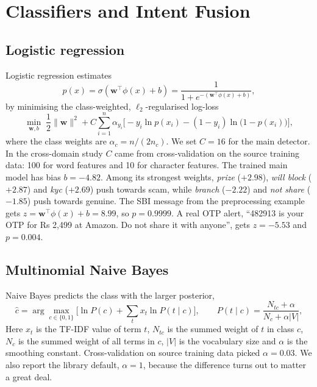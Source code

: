 \section{Classifiers and Intent Fusion}\label{sec:fusion}
\subsection{Logistic regression}
Logistic regression estimates
\begin{equation}
p(x)=\sigma\!\left(\mathbf{w}^{\top}\phi(x)+b\right)=\frac{1}{1+e^{-(\mathbf{w}^{\top}\phi(x)+b)}},
\end{equation}
by minimising the class-weighted, $\ell_2$-regularised log-loss
\begin{equation}
\min_{\mathbf{w},b}\;\frac{1}{2}\|\mathbf{w}\|^2 + C\sum_{i=1}^{n}\alpha_{y_i}\Big[-y_i\ln p(x_i)-(1-y_i)\ln\big(1-p(x_i)\big)\Big],
\end{equation}
where the class weights are $\alpha_c=n/(2n_c)$. We set $C=16$ for the main detector. In the cross-domain study $C$ came from cross-validation on the source training data: 100 for word features and 10 for character features. The trained main model has bias $b=-4.82$. Among its strongest weights, \textit{prize} ($+2.98$), \textit{will block} ($+2.87$) and \textit{kyc} ($+2.69$) push towards scam, while \textit{branch} ($-2.22$) and \textit{not share} ($-1.85$) push towards genuine. The SBI message from the preprocessing example gets $z=\mathbf{w}^\top\phi(x)+b=8.99$, so $p=0.9999$. A real OTP alert, ``482913 is your OTP for Rs 2,499 at Amazon. Do not share it with anyone'', gets $z=-5.53$ and $p=0.004$.

\subsection{Multinomial Naive Bayes}
Naive Bayes predicts the class with the larger posterior,
\begin{equation}
\hat{c}=\arg\max_{c\in\{0,1\}}\Big[\ln P(c)+\sum_{t} x_t \ln P(t\mid c)\Big],\qquad P(t\mid c)=\frac{N_{tc}+\alpha}{N_c+\alpha|V|},
\end{equation}
Here $x_t$ is the TF-IDF value of term $t$, $N_{tc}$ is the summed weight of $t$ in class $c$, $N_c$ is the summed weight of all terms in $c$, $|V|$ is the vocabulary size and $\alpha$ is the smoothing constant. Cross-validation on source training data picked $\alpha=0.03$. We also report the library default, $\alpha=1$, because the difference turns out to matter a great deal.

